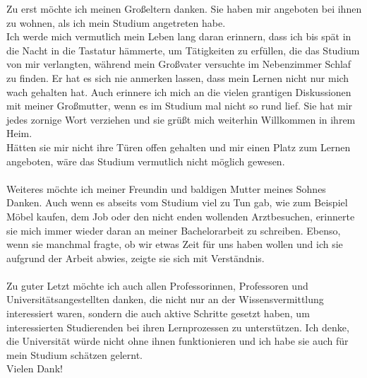 \documentclass[draft,final]{vutinfth} %
\begin{document}
	


\frontmatter %

\addstatementpage

\begin{danksagung*}
Zu erst möchte ich meinen Großeltern danken. Sie haben mir angeboten bei ihnen zu wohnen, als ich mein Studium angetreten habe.\\
Ich werde mich vermutlich mein Leben lang daran erinnern, dass ich bis spät in die Nacht in die Tastatur hämmerte, um Tätigkeiten zu erfüllen, die das Studium von mir verlangten, während mein Großvater versuchte im Nebenzimmer Schlaf zu finden. Er hat es sich nie anmerken lassen, dass mein Lernen nicht nur mich wach gehalten hat. Auch erinnere ich mich an die vielen grantigen Diskussionen mit meiner Großmutter, wenn es im Studium mal nicht so rund lief. Sie hat mir jedes zornige Wort verziehen und sie grüßt mich weiterhin Willkommen in ihrem Heim.\\
Hätten sie mir nicht ihre Türen offen gehalten und mir einen Platz zum Lernen angeboten, wäre das Studium vermutlich nicht möglich gewesen.\\
\\
Weiteres möchte ich meiner Freundin und baldigen Mutter meines Sohnes Danken. Auch wenn es abseits vom Studium viel zu Tun gab, wie zum Beispiel Möbel kaufen, dem Job oder den nicht enden wollenden Arztbesuchen, erinnerte sie mich immer wieder daran an meiner Bachelorarbeit zu schreiben. Ebenso, wenn sie manchmal fragte, ob wir etwas Zeit für uns haben wollen und ich sie aufgrund der Arbeit abwies, zeigte sie sich mit Verständnis.\\
\\
Zu guter Letzt möchte ich auch allen Professorinnen, Professoren und Universitätsangestellten danken, die nicht nur an der Wissensvermittlung interessiert waren, sondern die auch aktive Schritte gesetzt haben, um interessierten Studierenden bei ihren Lernprozessen zu unterstützen. Ich denke, die Universität würde nicht ohne ihnen funktionieren und ich habe sie auch für mein Studium schätzen gelernt.\\
Vielen Dank!
\end{danksagung*}
\end{document}
